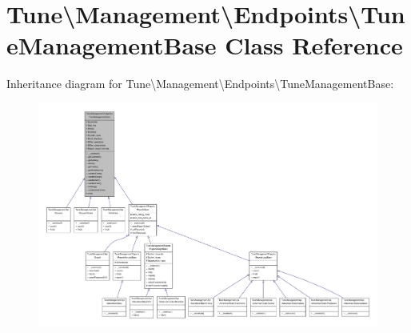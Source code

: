 \hypertarget{classTune_1_1Management_1_1Endpoints_1_1TuneManagementBase}{\section{Tune\textbackslash{}Management\textbackslash{}Endpoints\textbackslash{}Tune\-Management\-Base Class Reference}
\label{classTune_1_1Management_1_1Endpoints_1_1TuneManagementBase}
}


Inheritance diagram for Tune\textbackslash{}Management\textbackslash{}Endpoints\textbackslash{}Tune\-Management\-Base\-:
\nopagebreak
\begin{figure}[H]
\begin{center}
\leavevmode
\includegraphics[width=350pt]{classTune_1_1Management_1_1Endpoints_1_1TuneManagementBase__inherit__graph}
\end{center}
\end{figure}


